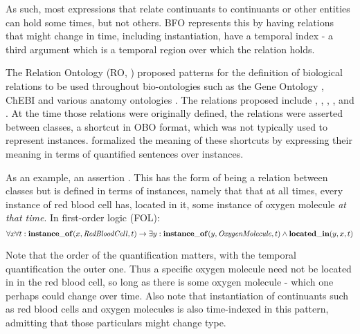 As such, most expressions that relate continuants to continuants or
other entities can hold some times, but not others. BFO represents
this by having relations that might change in time, including
instantiation, have a temporal index - a third argument
which is a temporal region over which the relation holds.

The Relation Ontology (RO, \cite{OBO:RO}) proposed patterns for the
definition of biological relations to be used throughout
bio-ontologies such as the Gene Ontology \cite{go2000}, ChEBI
\cite{chebinar2013} and various anatomy ontologies \cite{uberon2012}.
 The relations proposed include ,
, , , and
. At the time those relations were originally
defined, the relations were asserted between classes, a shortcut in
OBO format, which was not typically used to represent
instances. \cite{OBO:RO} formalized the meaning of these shortcuts
by expressing their meaning in terms of quantified sentences over
instances.


As an example, an assertion 
 . This has the form of being a relation between classes but is defined in terms of 
instances, namely that that at all times, every instance of red blood cell has, located in it, some instance of oxygen molecule \emph{at that time}.  In first-order logic (FOL):
\begin{equation}
\forall x \forall t : \mathrm{\mathbf{instance\_of}}(x, \mathit{RedBloodCell}, t) \rightarrow 
\exists y : \mathrm{\mathbf{instance\_of}}(y, \mathit{OxygenMolecule}, t) \wedge \mathrm{\mathbf{located\_in}}(y, x, t)
\end{equation}



Note that the order of the quantification matters, with
the temporal quantification the outer one. Thus a specific oxygen
molecule need not be located in in the red blood cell, so long as
there is some oxygen molecule - which one perhaps could change over
time. Also note that instantiation of continuants such as red blood
cells and oxygen molecules is also time-indexed in this pattern,
admitting that those particulars might change type.


